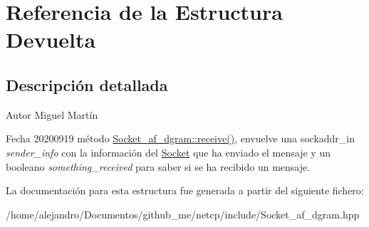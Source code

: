 \hypertarget{structDevuelta}{}\section{Referencia de la Estructura Devuelta}
\label{structDevuelta}


\subsection{Descripción detallada}
\begin{DoxyAuthor}{Autor}
Miguel Martín 
\end{DoxyAuthor}
\begin{DoxyDate}{Fecha}
20200919 método \hyperlink{classSocket__af__dgram_ac7d122d2317d980c48964076c3c7e2bb}{Socket\+\_\+af\+\_\+dgram\+::receive()}, envuelve una sockaddr\+\_\+in {\itshape sender\+\_\+info} con la información del \hyperlink{classSocket}{Socket} que ha enviado el mensaje y un booleano {\itshape something\+\_\+received} para saber si se ha recibido un mensaje. 
\end{DoxyDate}


La documentación para esta estructura fue generada a partir del siguiente fichero\+:\begin{DoxyCompactItemize}
\item 
/home/alejandro/\+Documentos/github\+\_\+me/netcp/include/Socket\+\_\+af\+\_\+dgram.\+hpp\end{DoxyCompactItemize}
